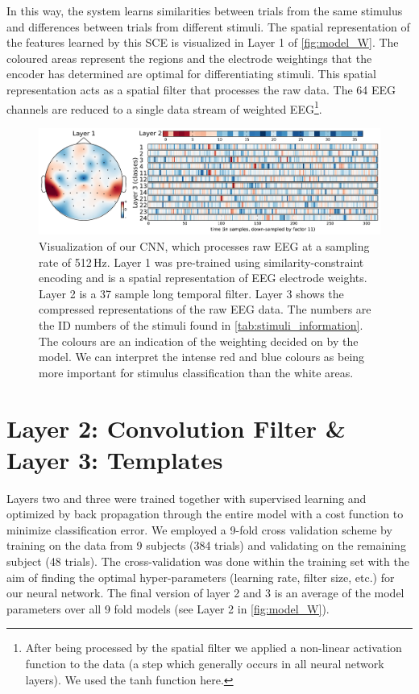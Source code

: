 In this way, the system learns similarities between trials from the same stimulus and differences between trials from different stimuli.  
The spatial representation of the features learned by this \ac{SCE} is visualized in Layer 1 of \autoref{fig:model_W}. 
The coloured areas represent the regions and the electrode weightings that the encoder has determined are optimal for differentiating stimuli.
This spatial representation acts as a spatial filter that processes the raw data.
The 64 EEG channels are reduced to a single data stream of weighted EEG\footnote{After being processed by the spatial filter we applied a non-linear activation function to the data (a step which generally occurs in all neural network layers).
We used the tanh function here.}. 
\begin{figure}[h] 
  \begin{center}
    \includegraphics[width=\textwidth,keepaspectratio=true]{Figures/model_W}
    \caption{Visualization of our \ac{CNN}, which processes raw EEG at a sampling rate of 512\,Hz.
    Layer 1 was pre-trained using similarity-constraint encoding and is a spatial representation of EEG electrode weights. Layer 2 is a 37 sample long temporal filter. Layer 3 shows the compressed representations of the raw EEG data. The numbers are the ID numbers of the stimuli found in \autoref{tab:stimuli_information}. The colours are an indication of the weighting decided on by the model. We can interpret the intense red and blue colours as being more important for stimulus classification than the white areas.}
    \label{fig:model_W}
  \end{center}
\end{figure}
\section{Layer 2: Convolution Filter \& Layer 3: Templates}
Layers two and three were trained together with supervised learning and optimized by back propagation through the entire model with a cost function to minimize classification error.
We employed a 9-fold cross validation scheme by training on the data from 9 subjects (384 trials) and validating on the remaining subject (48 trials).
The cross-validation was done within the training set with the aim of finding the optimal hyper-parameters (learning rate, filter size, etc.) for our neural network. 
The final version of layer 2 and 3 is an average of the model parameters over all 9 fold models (see Layer 2 in \autoref{fig:model_W}).
